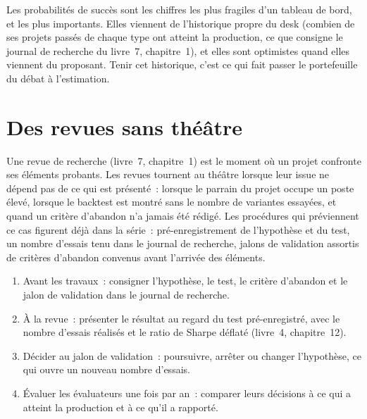 \begin{remark}\label{rem:fm:managing-researchers-traders-and-engineers:inputs}
Les probabilités de succès sont les chiffres les plus fragiles d'un tableau de bord, et les plus importants. Elles viennent de l'historique propre du desk (combien de
ses projets passés de chaque type ont atteint la production, ce que consigne le journal de recherche du livre~7, chapitre~1), et elles sont optimistes quand
elles viennent du proposant. Tenir cet historique, c'est ce qui fait passer le portefeuille du débat à l'estimation.
\end{remark}

\section{Des revues sans théâtre}

Une revue de recherche (livre~7, chapitre~1) est le moment où un projet confronte ses éléments probants. Les revues tournent au théâtre lorsque leur issue ne dépend pas
de ce qui est présenté~: lorsque le parrain du projet occupe un poste élevé, lorsque le backtest est montré sans le nombre de variantes essayées, et quand un critère d'abandon
n'a jamais été rédigé. Les procédures qui préviennent ce cas figurent déjà dans la série~: pré-enregistrement de l'hypothèse et du test, un nombre d'essais
tenu dans le journal de recherche, jalons de validation assortis de critères d'abandon convenus avant l'arrivée des éléments.

\begin{method}\label{met:fm:managing-researchers-traders-and-engineers:review}
\begin{enumerate}
\item Avant les travaux~: consigner l'hypothèse, le test, le critère d'abandon et le jalon de validation dans le journal de recherche.
\item À la revue~: présenter le résultat au regard du test pré-enregistré, avec le nombre d'essais réalisés et le ratio de Sharpe déflaté
(livre~4, chapitre~12).
\item Décider au jalon de validation~: poursuivre, arrêter ou changer l'hypothèse, ce qui ouvre un nouveau nombre d'essais.
\item Évaluer les évaluateurs une fois par an~: comparer leurs décisions à ce qui a atteint la production et à ce qu'il a rapporté.
\end{enumerate}
\end{method}

